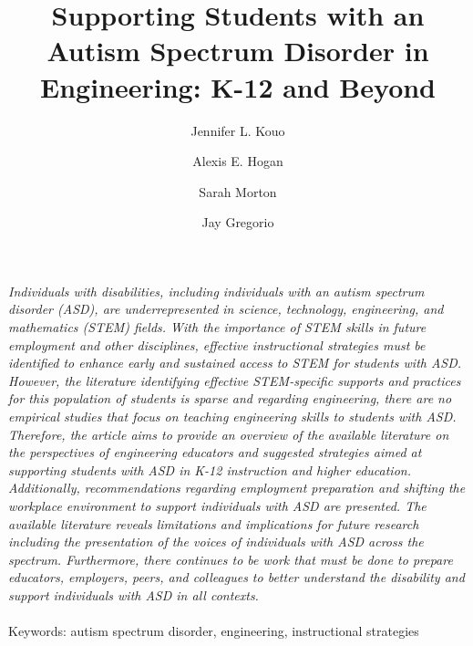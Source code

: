 \documentclass[11.5pt]{sig-alternate}
\makeatletter
\let\oldabstract\abstract
\let\oldendabstract\endabstract
\renewenvironment{abstract}
{\renewenvironment{quotation}%
               {\list{}{\addtolength{\leftmargin}{1em} %
                        \listparindent 1.5em%
                        \itemindent    \listparindent%
                        \rightmargin   \leftmargin%
                        \parsep        \z@ \@plus\p@}%
                \item\relax}%
               {\endlist}%
\oldabstract}
{\oldendabstract}
\makeatother
\begin{document}
\title{Supporting Students with an Autism Spectrum Disorder in Engineering: K-12 and Beyond }

\author[1]{\large \color{blue}Jennifer L. Kouo}
\author[1]{\large \color{blue}Alexis E. Hogan}
\author[1]{\large \color{blue}Sarah Morton}
\author[2]{\large \color{blue}Jay Gregorio}
\toappear{}
\maketitle
\begin{@twocolumnfalse} 
\begin{abstract}
\item 
 \textit {Individuals with disabilities, including individuals with an autism spectrum disorder (ASD), are underrepresented in science, technology, engineering, and mathematics (STEM) fields. With the importance of STEM skills in future employment and other disciplines, effective instructional strategies must be identified to enhance early and sustained access to STEM for students with ASD. However, the literature identifying effective STEM-specific supports and practices for this population of students is sparse and regarding engineering, there are no empirical studies that focus on teaching engineering skills to students with ASD. Therefore, the article aims to provide an overview of the available literature on the perspectives of engineering educators and suggested strategies aimed at supporting students with ASD in K-12 instruction and higher education. Additionally, recommendations regarding employment preparation and shifting the workplace environment to support individuals with ASD are presented. The available literature reveals limitations and implications for future research including the presentation of the voices of individuals with ASD across the spectrum. Furthermore, there continues to be work that must be done to prepare educators, employers, peers, and colleagues to better understand the disability and support individuals with ASD in all contexts.}
     \\
     \\
     Keywords: autism spectrum disorder, engineering, instructional strategies
\end{abstract}
\end{@twocolumnfalse}




\end{document}
